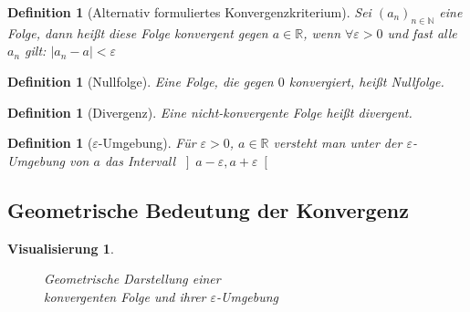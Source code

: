 \documentclass[11pt, twoside, a4paper]{article}
\theoremstyle{plain}
\newtheorem{definition}[blockelement]{Definition}
\newtheorem{visualisierung}[blockelement]{Visualisierung}
\newcommand{\abs}[1]{\left|#1\right|}
\newcommand{\naturalnumbers}{\mathbb{N}}
\newcommand{\realnumbers}{\mathbb{R}}
\begin{document}
    \begin{definition}[Alternativ formuliertes Konvergenzkriterium]
        Sei $(a_n)_{n\in\naturalnumbers}$ eine Folge, dann heißt diese Folge konvergent gegen $a\in\realnumbers$, wenn $\forall \varepsilon > 0$ und fast alle $a_n$ gilt: $\abs{a_n-a}<\varepsilon$
    \end{definition}

    \begin{definition}[Nullfolge]
        Eine Folge, die gegen $0$ konvergiert, heißt Nullfolge.
    \end{definition}

    \begin{definition}[Divergenz]
        Eine nicht-konvergente Folge heißt divergent.
    \end{definition}

    \begin{definition}[$\varepsilon$-Umgebung]
        Für $\varepsilon > 0$, $a\in\realnumbers$ versteht man unter der $\varepsilon$-Umgebung von $a$ das Intervall $\left]a-\varepsilon, a+\varepsilon\right[$
    \end{definition}

    \subsection{Geometrische Bedeutung der Konvergenz}

    \begin{visualisierung}
        ~
        \begin{figure}[H]
            \centering
            \caption{Geometrische Darstellung einer\\ konvergenten Folge und ihrer $\varepsilon$-Umgebung}
        \end{figure}
    \end{visualisierung}
\end{document}
